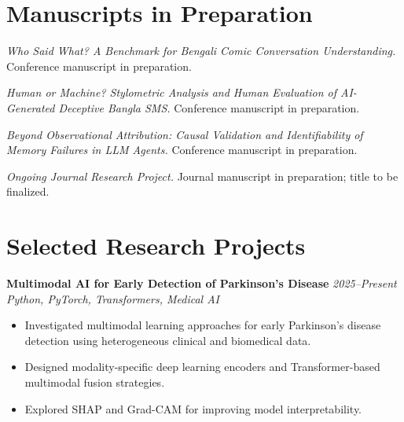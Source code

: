 \documentclass[a4paper,11pt]{article}
\newcommand{\project}[3]{
  \textbf{#1} \hfill \textit{#3}\\
  \textit{#2}\\[-0.25em]
}
\begin{document}
\section*{Manuscripts in Preparation}

\begin{enumerate}[leftmargin=1.65em,label={[\arabic*]},itemsep=5pt]

\item \textit{Who Said What? A Benchmark for Bengali Comic Conversation
Understanding.} Conference manuscript in preparation.

\item \textit{Human or Machine? Stylometric Analysis and Human Evaluation
of AI-Generated Deceptive Bangla SMS.} Conference manuscript in preparation.

\item \textit{Beyond Observational Attribution: Causal Validation and
Identifiability of Memory Failures in LLM Agents.}
Conference manuscript in preparation.

\item \textit{Ongoing Journal Research Project.}
Journal manuscript in preparation; title to be finalized.

\end{enumerate}

\section*{Selected Research Projects}

\project
{Multimodal AI for Early Detection of Parkinson's Disease}
{Python, PyTorch, Transformers, Medical AI}
{2025--Present}

\begin{itemize}
    \item Investigated multimodal learning approaches for early Parkinson's
    disease detection using heterogeneous clinical and biomedical data.
    \item Designed modality-specific deep learning encoders and
    Transformer-based multimodal fusion strategies.
    \item Explored SHAP and Grad-CAM for improving model interpretability.
\end{itemize}
\end{document}
